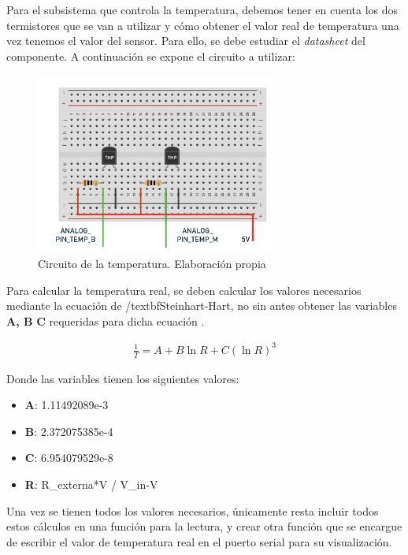 Para el subsistema que controla la temperatura, debemos tener en cuenta los dos termistores que se van a utilizar y cómo obtener el valor real de temperatura una vez tenemos el valor del sensor. Para ello, se debe estudiar el \textit{datasheet} del componente. A continuación se expone el circuito a utilizar:

\begin{figure}[h]
    \centering
    \includegraphics[width=0.7\textwidth]{imagenes/diagramas/temp_ard.png}
    \caption{Circuito de la temperatura. Elaboración propia}
\end{figure}



Para calcular la temperatura real, se deben calcular los valores necesarios mediante la ecuación de /textbf{Steinhart-Hart}, no sin antes obtener las variables \textbf{A, B } \textbf{C} requeridas para dicha ecuación \cite{termistor}.

\begin{align*}
    \frac{1}{T} = A + B\ln{R} + C(\ln{R})^{3}
\end{align*}

Donde las variables tienen los siguientes valores:
\begin{itemize}
    \item \textbf{A}: 1.11492089e-3
    \item \textbf{B}: 2.372075385e-4
    \item \textbf{C}: 6.954079529e-8
    \item \textbf{R}: R\_externa*V / V\_in-V
\end{itemize}

Una vez se tienen todos los valores necesarios, únicamente resta incluir todos estos cálculos en una función para la lectura, y crear otra función que se encargue de escribir el valor de temperatura real en el puerto serial para su visualización.

